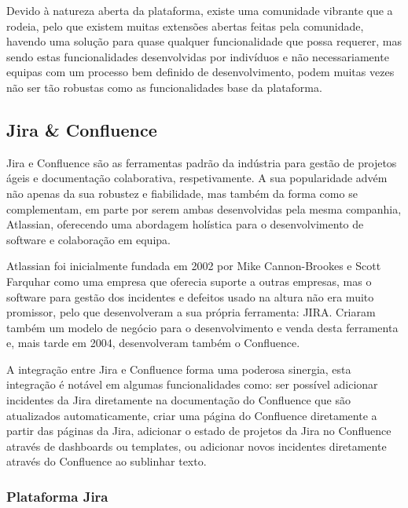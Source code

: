                 Devido à natureza aberta da plataforma, existe uma comunidade vibrante que a rodeia, pelo que existem muitas extensões abertas feitas pela comunidade, havendo uma solução para quase qualquer funcionalidade que possa requerer, mas sendo estas funcionalidades desenvolvidas por indivíduos e não necessariamente equipas com um processo bem definido de desenvolvimento, podem muitas vezes não ser tão robustas como as funcionalidades base da plataforma.

    \subsection{Jira \& Confluence}\label{fuck_confluence_jira}

        Jira e Confluence são as ferramentas padrão da indústria para gestão de projetos ágeis e documentação colaborativa, respetivamente. A sua popularidade advém não apenas da sua robustez e fiabilidade, mas também da forma como se complementam, em parte por serem ambas desenvolvidas pela mesma companhia, Atlassian, oferecendo uma abordagem holística para o desenvolvimento de software e colaboração em equipa.

        Atlassian foi inicialmente fundada em 2002 por Mike Cannon-Brookes e Scott Farquhar como uma empresa que oferecia suporte a outras empresas, mas o software para gestão dos incidentes e defeitos usado na altura não era muito promissor, pelo que desenvolveram a sua própria ferramenta: JIRA. Criaram também um modelo de negócio para o desenvolvimento e venda desta ferramenta e, mais tarde em 2004, desenvolveram também o Confluence\cite{20-years-atlassian}.

        A integração entre Jira e Confluence forma uma poderosa sinergia, esta integração é notável em algumas funcionalidades como: ser possível adicionar incidentes da Jira diretamente na documentação do Confluence que são atualizados automaticamente, criar uma página do Confluence diretamente a partir das páginas da Jira, adicionar o estado de projetos da Jira no Confluence através de dashboards ou templates, ou adicionar novos incidentes diretamente através do Confluence ao sublinhar texto. 

        \subsubsection{Plataforma Jira}\label{secsec:jira}

